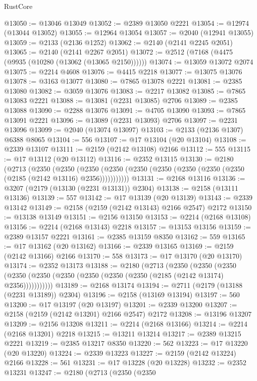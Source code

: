 \begin{lexlean}{RustCore}
\begin{coremodule}
@13050 := @13046 @13049
@13052 := @2389 @13050 @2221
@13054 := @12974 (@13044 @13052)
@13055 := @12964 @13054
@13057 := @2040 (@12941 @13055)
@13059 := @2133 (@2136 @1252)
@13062 := @2140 (@2141 @2245 @2051)
@13065 := @2140 (@2141 @2267 @2051)
@13072 := @2512 (@7168 (@4475 (@9935 (@10280 (@13062 (@13065 @2150))))))
@13074 := @13059 @13072 @2074
@13075 := @2214 @4608
@13076 := @4415 @2218
@13077 := @13075 @13076
@13078 := @3163 @13077
@13080 := @7865 @13078 @2221
@13081 := @2385 @13080
@13082 := @3059 @13076
@13083 := @2217 @13082
@13085 := @7865 @13083 @2221
@13088 := @13081 (@2231 @13085) @2706
@13089 := @2385 @13088
@13090 := @2288 @13076
@13091 := @4705 @13090
@13093 := @7865 @13091 @2221
@13096 := @13089 (@2231 @13093) @2706
@13097 := @2231 @13096
@13099 := @2040 (@13074 @13097)
@13103 := @2133 (@2136 @1307) @6388 @8065
@13104 := 556
@13107 := @17 @13104 (@20 @13104)
@13108 := @2339 @13107
@13111 := @2159 (@2142 @13108) @2166
@13112 := 555
@13115 := @17 @13112 (@20 @13112)
@13116 := @2352 @13115
@13130 := @2180
    (@2713
      (@2350
        (@2350
          (@2350 (@2350 (@2350 (@2350 (@2350 (@2350 (@2350 (@2185 (@2142 @13116) @2356)))))))))))
@13131 := @2168 @13116
@13136 := @3207 (@2179 (@13130 (@2231 @13131)) @2304)
@13138 := @2158 (@13111 @13136)
@13139 := 557
@13142 := @17 @13139 (@20 @13139)
@13143 := @2339 @13142
@13149 := @2158 (@2159 (@2142 @13143) @2166 @2547) @2172
@13150 := @13138 @13149
@13151 := @2156 @13150
@13153 := @2214 (@2168 @13108)
@13156 := @2214 (@2168 @13143) @2218
@13157 := @13153 @13156
@13159 := @2389 @13157 @2221
@13161 := @2385 @13159 @8350
@13162 := 559
@13165 := @17 @13162 (@20 @13162)
@13166 := @2339 @13165
@13169 := @2159 (@2142 @13166) @2166
@13170 := 558
@13173 := @17 @13170 (@20 @13170)
@13174 := @2352 @13173
@13188 := @2180
    (@2713
      (@2350
        (@2350
          (@2350 (@2350 (@2350 (@2350 (@2350 (@2350 (@2350 (@2185 (@2142 @13174) @2356)))))))))))
@13189 := @2168 @13174
@13194 := @2711 (@2179 (@13188 (@2231 @13189)) @2304)
@13196 := @2158 (@13169 @13194)
@13197 := 560
@13200 := @17 @13197 (@20 @13197)
@13201 := @2339 @13200
@13207 := @2158 (@2159 (@2142 @13201) @2166 @2547) @2172
@13208 := @13196 @13207
@13209 := @2156 @13208
@13211 := @2214 (@2168 @13166)
@13214 := @2214 (@2168 @13201) @2218
@13215 := @13211 @13214
@13217 := @2389 @13215 @2221
@13219 := @2385 @13217 @8350
@13220 := 562
@13223 := @17 @13220 (@20 @13220)
@13224 := @2339 @13223
@13227 := @2159 (@2142 @13224) @2166
@13228 := 561
@13231 := @17 @13228 (@20 @13228)
@13232 := @2352 @13231
@13247 := @2180
    (@2713
      (@2350
        (@2350

\end{coremodule}
\end{lexlean}
